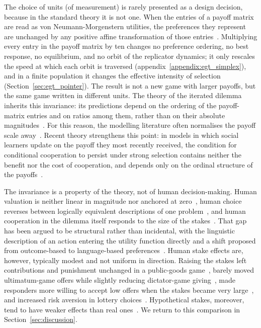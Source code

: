 \documentclass[11pt,a4paper]{article}
\newcommand{\rev}[1]{{\color{red}#1}}
\newcommand{\rev}[1]{#1}
\begin{document}
The choice of units (of measurement)  is rarely presented as a design decision, because
in the standard theory it is not one. \rev{When the entries of a payoff matrix
are read as von Neumann-Morgenstern utilities, the preferences they represent
are unchanged by any positive affine transformation of those
entries}~\cite{von2007theory,luce1957games}. Multiplying every
entry in the payoff matrix by ten changes no preference ordering, no best response, no
equilibrium, and no \rev{orbit} of the replicator dynamics\rev{; it only
rescales the speed at which each orbit is traversed
(appendix~\ref{appendix:egt_simplex}), and in a finite population it changes
the effective intensity of selection (Section~\ref{sec:egt_pointer})}. The result is not a
new game with larger payoffs, but the same game written in different units.  The
theory of the iterated dilemma inherits this invariance: its predictions depend 
on the ordering of the  payoff-matrix entries  and on ratios among them, rather than on
their absolute magnitudes~\cite{axelrod1981evolution,nowak1992tit,nowak1993strategy,pressDyson2012}.
For this reason, the modelling literature often normalises the payoff scale
away~\cite{szabo2007evolutionary,perc2010coevolutionary,wang2015universal}.
\rev{Recent} theory strengthens this point: in models in which social
learners update on the payoff they most recently received, the condition for
conditional cooperation to persist under strong selection contains neither the
benefit nor the cost of cooperation, and depends only on the ordinal structure
of the payoffs~\cite{glynatsi2024evolution}.

The invariance is a property of the theory, not of human decision-making. Human valuation is neither
linear in magnitude nor anchored at zero~\cite{kahneman1979prospect}, human
choice reverses between logically equivalent descriptions of one
problem~\cite{tversky1981framing}, and human cooperation in the dilemma itself
responds to the size of the stakes~\cite{krockow2016cooperation,list2006friend}.
That gap has been argued to be structural rather than incidental, with the
linguistic description of an action entering the utility function directly and
a shift proposed from outcome-based to language-based
preferences~\cite{capraro2024language}.
\rev{Human stake effects are, however, typically modest and not uniform in
direction. Raising the stakes left contributions and punishment unchanged in a
public-goods game~\cite{kocher2008does}, barely moved ultimatum-game offers
while slightly reducing dictator-game giving~\cite{larney2019stake,engel2011dictator},
made responders more willing to accept low offers when the stakes became
very large~\cite{andersen2011stakes,cameron1999raising}, and increased risk
aversion in lottery choices~\cite{holt2002risk}. Hypothetical stakes, moreover,
tend to have weaker effects than real ones~\cite{camerer1999effects}. We
return to this comparison in Section~\ref{sec:discussion}.}
\end{document}
